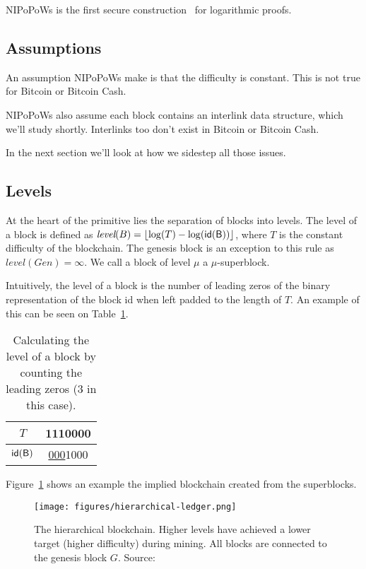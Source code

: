 NIPoPoWs is the first secure construction~\cite{nipopows} for logarithmic proofs.

\subsection{Assumptions}
An assumption NIPoPoWs make is that the difficulty is constant. This is not true for Bitcoin or Bitcoin Cash.


NIPoPoWs also assume each block contains an interlink data structure, which we'll study shortly. Interlinks too don't exist in Bitcoin or Bitcoin Cash.

In the next section we'll look at how we sidestep all those issues.

\subsection{Levels}
At the heart of the primitive lies the separation of blocks into levels. The level of a block is defined as $\textit{level}(B) = \left \lfloor \log(T) - \log(\sf{id}(B)) \right \rfloor$, where $T$ is the constant difficulty of the blockchain. The genesis block is an exception to this rule as  $\textit{level}(Gen) = \infty$. We call a block of level $\mu$ a $\mu$-superblock.

Intuitively, the level of a block is the number of leading zeros of the binary representation of the block id when left padded to the length of $T$. An example of this can be seen on Table~\ref{table:level-counting}.

\begin{table}
  \centering
  \begin{tabular}{|c|c|}
    \hline
    $T$ & 1110000 \\
    \hline
    $\sf{id}(B)$ & \underline{000}1000 \\
    \hline
  \end{tabular}
  \caption{Calculating the level of a block by counting the leading zeros (3 in this case).}
  \label{table:level-counting}
\end{table}

Figure~\ref{fig:hierarchy} shows an example  the implied blockchain created from the superblocks.

\begin{figure}
  \centering
  \texttt{[image: figures/hierarchical-ledger.png]}
  \caption{The hierarchical blockchain.  Higher levels have achieved a lower target (higher difficulty) during mining. All blocks are connected to the genesis block $G$. Source:~\cite{nipopows}}
  \label{fig:hierarchy}
\end{figure}

